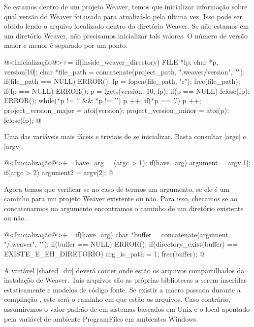 {

Se estamos dentro de um projeto Weaver, temos que inicializar
informação sobre qual versão do Weaver foi usada para atualizá-lo pela
última vez. Isso pode ser obtido lendo o arquivo
 localizado dentro do diretório Weaver. Se não
estamos em um diretório Weaver, não precisamos inicializar tais
valores. O número de versão maior e menor é separado por um ponto.

\iniciocodigo
@<Inicialização@>+=
if(inside_weaver_directory){
  FILE *fp;
  char *p, version[10];
  char *file_path = concatenate(project_path, ".weaver/version", "");
  if(file_path == NULL) ERROR();
  fp = fopen(file_path, "r");
  free(file_path);
  if(fp == NULL) ERROR();
  p = fgets(version, 10, fp);
  if(p == NULL){ fclose(fp); ERROR(); }
  while(*p != '.' && *p != '\0') p ++;
  if(*p == '.') p ++;
  project_version_major = atoi(version);
  project_version_minor = atoi(p);
  fclose(fp);
}
@
\fimcodigo


Uma das variáveis mais fáceis e triviais de se inicializar. Basta
consultar |argc| e |argv|.

\iniciocodigo
@<Inicialização@>+=
have_arg = (argc > 1);
if(have_arg) argument = argv[1];
if(argc > 2) argument2 = argv[2];
@
\fimcodigo


Agora temos que verificar se no caso de termos um argumento, se ele é
um caminho para um projeto Weaver existente ou não. Para isso,
checamos se ao concatenarmos  no argumento
encontramos o caminho de um diretório existente ou não.

\iniciocodigo
@<Inicialização@>+=
if(have_arg){
  char *buffer = concatenate(argument, "/.weaver", "");
  if(buffer == NULL) ERROR();
  if(directory_exist(buffer) == EXISTE_E_EH_DIRETORIO){
    arg_is_path = 1;
  }
  free(buffer);
}
@
\fimcodigo


A variável |shared_dir| deverá conter onde estão os arquivos
compartilhados da instalação de Weaver. Tais arquivos são as próprias
bibliotecas a serem inseridas estaticamente e modelos de código
fonte. Se existir a macro passada durante a
compilação , este será o caminho em que estão
os arquivos. Caso contrário, assumiremos o valor padrão
de  em sistemas baseados em Unix e
o local apontado pela variável de ambiente ProgramFiles em ambientes
Windows.

}
